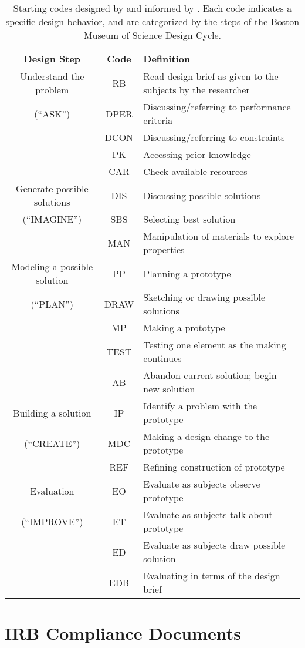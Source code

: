 %
\begin{table}
\begin{centering}
\begin{tabular}{|c|c| p{2.5in} |}
\hline
Design Step & Code & Definition\tabularnewline
\hline
Understand the problem & RB & Read design brief as given to the subjects by the researcher\tabularnewline
\cline{2-3}
({}``ASK'') & DPER & Discussing/referring to performance criteria\tabularnewline
\cline{2-3}
 & DCON & Discussing/referring to constraints\tabularnewline
\cline{2-3}
 & PK & Accessing prior knowledge\tabularnewline
\cline{2-3}
 & CAR & Check available resources\tabularnewline
\hline
Generate possible solutions & DIS & Discussing possible solutions\tabularnewline
\cline{2-3}
({}``IMAGINE'') & SBS & Selecting best solution\tabularnewline
\cline{2-3}
 & MAN & Manipulation of materials to explore properties\tabularnewline
\hline
Modeling a possible solution & PP & Planning a prototype\tabularnewline
\cline{2-3}
({}``PLAN'') & DRAW & Sketching or drawing possible solutions\tabularnewline
\cline{2-3}
 & MP & Making a prototype\tabularnewline
\cline{2-3}
 & TEST & Testing one element as the making continues\tabularnewline
\cline{2-3}
 & AB & Abandon current solution; begin new solution\tabularnewline
\hline
Building a solution & IP & Identify a problem with the prototype\tabularnewline
\cline{2-3}
({}``CREATE'') & MDC & Making a design change to the prototype\tabularnewline
\cline{2-3}
 & REF & Refining construction of prototype\tabularnewline
\hline
Evaluation & EO & Evaluate as subjects observe prototype\tabularnewline
\cline{2-3}
({}``IMPROVE'') & ET & Evaluate as subjects talk about prototype\tabularnewline
\cline{2-3}
 & ED & Evaluate as subjects draw possible solution\tabularnewline
\cline{2-3}
 & EDB & Evaluating in terms of the design brief\tabularnewline
\hline
\end{tabular}
\par

\end{centering}

\caption[Starting codes.]{Starting codes designed by \citet{REESE} and informed by \citet{welch}. Each code indicates a specific design behavior, and are categorized by the steps of the Boston Museum of Science Design Cycle.}

\label{tab:starting-codes}

\end{table}

\chapter{IRB Compliance Documents}


